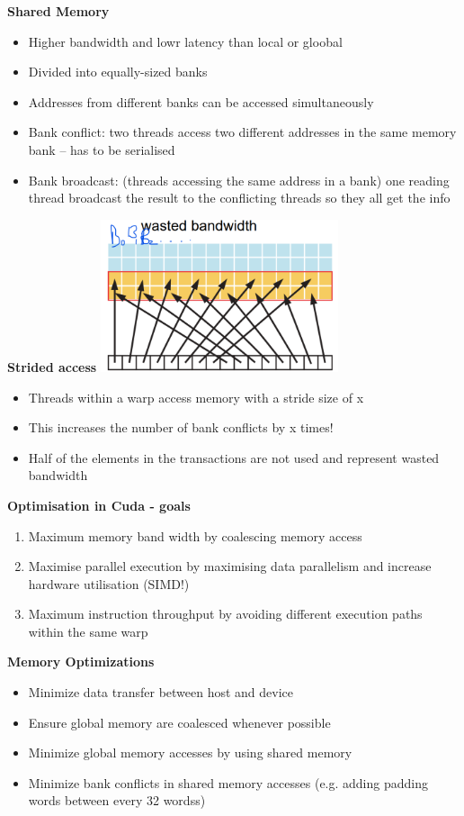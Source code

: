 \documentclass[10pt, landscape]{article}
\begin{document}
\begin{multicols}{4}
\textbf{Shared Memory}
\begin{itemize}
    \item Higher bandwidth and lowr latency than local or gloobal 
    \item Divided into equally-sized banks 
    \item Addresses from different banks can be accessed simultaneously
    \item Bank conflict: two threads access two different addresses in the same memory bank -- has to be serialised 
    \item Bank broadcast: (threads accessing the same address in a bank) one reading thread broadcast the result to the conflicting threads so they all get the info
\end{itemize}

\textbf{Strided access}
\includegraphics*[width=7cm]{strided access.png}
\begin{itemize}
    \item Threads within a warp access memory with a stride size of x 
    \item This increases the number of bank conflicts by x times! 
    \item Half of the elements in the transactions are not used and represent wasted bandwidth
\end{itemize}

\textbf{Optimisation in Cuda - goals}
\begin{enumerate}
    \item Maximum memory band width by coalescing memory access
    \item Maximise parallel execution by maximising data parallelism and increase hardware utilisation (SIMD!)
    \item Maximum instruction throughput by avoiding different execution paths within the same warp
\end{enumerate}

\textbf{Memory Optimizations}
\begin{itemize}
    \item Minimize data transfer between host and device
    \item Ensure global memory are coalesced whenever possible
    \item Minimize global memory accesses by using shared memory 
    \item Minimize bank conflicts in shared memory accesses (e.g. adding padding words between every 32 wordss)
\end{itemize}


\end{multicols}
\end{document}
